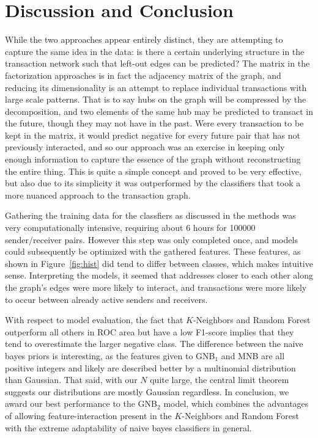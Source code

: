 \documentclass{article} %
\begin{document}
\section{Discussion and Conclusion}
While the two approaches appear entirely distinct, they are attempting to capture the same idea in the data: is there a certain underlying structure in the transaction network such that left-out edges can be predicted?  The matrix in the factorization approaches is in fact the adjacency matrix of the graph, and reducing its dimensionality is an attempt to replace individual transactions with large scale patterns.  That is to say hubs on the graph will be compressed by the decomposition, and two elements of the same hub may be predicted to transact in the future, though they may not have in the past.  Were every transaction to be kept in the matrix, it would predict negative for every future pair that has not previously interacted, and so our approach was an exercise in keeping only enough information to capture the essence of the graph without reconstructing the entire thing.  This is quite a simple concept and proved to be very effective, but also due to its simplicity it was outperformed by the classifiers that took a more nuanced approach to the transaction graph. 

Gathering the training data for the classfiers as discussed in the methods was very computationally intensive, requiring about 6 hours for 100000 sender/receiver pairs.  However this step was only completed once, and models could subsequently be optimized with the gathered features.  These features, as shown in Figure~\ref{fig:hist} did tend to differ between classes, which makes intuitive sense.  Interpreting the models, it seemed that addresses closer to each other along the graph's edges were more likely to interact, and transactions were more likely to occur between already active senders and receivers.

With respect to model evaluation, the fact that $K$-Neighbors and Random Forest outperform all others in ROC area but have a low F1-score implies that they tend to overestimate the larger negative class.  The difference between the naive bayes priors is interesting, as the features given to GNB$_1$ and MNB are all positive integers and likely are described better by a multinomial distribution than Gaussian.  That said, with our $N$ quite large, the central limit theorem suggests our distributions are mostly Gaussian regardless.  In conclusion, we award our best performance to the GNB$_2$ model, which combines the advantages of allowing feature-interaction present in the $K$-Neighbors and Random Forest with the extreme adaptability of naive bayes classifiers in general.
\end{document}

